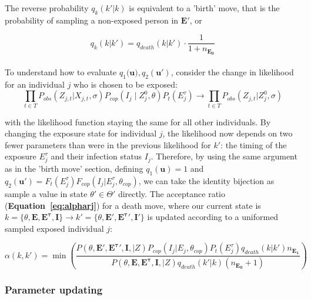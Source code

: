 The reverse probability $q_k(k' | k)$ is equivalent to a 'birth' move, that is the probability of sampling a non-exposed person in $\mathbf{E}'$, or 

\begin{equation}
q_k(k | k') = q_{death}(k | k')\cdot \frac{1}{1 + n_{\mathbf{E_0}}}
\end{equation}


\paragraph{}To understand how to evaluate $q_1(\mathbf{u)}, q_2(\mathbf{u}')$, consider the change in likelihood for an individual $j$ who is chosen to be exposed:
\begin{equation}
 \prod_{t \in T}P_{obs}(Z_{j,t}|X_{j,t}, \sigma)P_{cop}(I_j \mid  Z^0_{j}, \theta)P_t(E_j^\tau) \rightarrow \prod_{t \in T}P_{obs}(Z_{j,t}|Z^0_{j}, \sigma) 
\end{equation}

with the likelihood function staying the same for all other individuals. By changing the exposure state for individual $j$, the likelihood now depends on two fewer parameters than were in the previous likelihood for $k'$: the timing of the exposure $E^\tau_j$ and their infection status $I_j$. Therefore, by using the same argument as in the 'birth move' section, defining $q_1(\mathbf{u}) = 1$ and $q_2(\mathbf{u}') = F_t(E^\tau_j)F_{cop}(I_j | E_j^\tau, \theta_{cop})$, we can take the identity bijection as sample a value in state $\theta' \in \Theta'$ directly.  The acceptance ratio (\textbf{Equation~\ref{eq:alpharj}}) for a death move, where our current state is $k = \{\theta, \mathbf{E}, \mathbf{E^\tau}, \mathbf{I}\} \rightarrow k' = \{\theta, \mathbf{E}', \mathbf{E^\tau}', \mathbf{I}'\}$ is updated according to a uniformed sampled exposed individual $j$:

\begin{equation}
\label{acc:death}
\alpha(k, k') = \min\left(\frac{P(\theta, \mathbf{E}', \mathbf{E^{\tau}}', \mathbf{I}, | Z)P_{cop}(I_{j} | E_{j}, \theta_{cop})P_t(E^\tau_j)q_{death}(k|k')n_{\mathbf{E_1}}}{P(\theta, \mathbf{E}, \mathbf{E^{\tau}}, \mathbf{I}, | Z)q_{death}(k'|k)(n_{\mathbf{E_0}} + 1)} \right)
\end{equation}

\subsubsection{Parameter updating}


